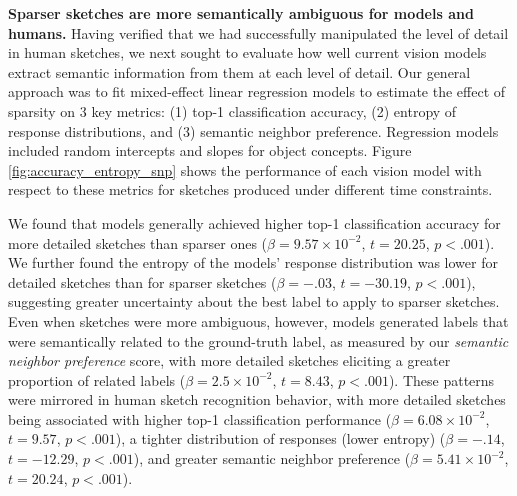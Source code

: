 \documentclass{article}
\begin{document}
\textbf{Sparser sketches are more semantically ambiguous for models and humans.}
Having verified that we had successfully manipulated the level of detail in human sketches, we next sought to evaluate how well current vision models extract semantic information from them at each level of detail. 
Our general approach was to fit mixed-effect linear regression models to estimate the effect of sparsity on 3 key metrics: (1) top-1 classification accuracy, (2) entropy of response distributions, and (3) semantic neighbor preference. Regression models included random intercepts and slopes for object concepts.
Figure \ref{fig:accuracy_entropy_snp} shows the performance of each vision model with respect to these metrics for sketches produced under different time constraints.



We found that models generally achieved higher top-1 classification accuracy for more detailed sketches than sparser ones ($\beta=9.57\times10^{-2}$, $t=20.25$, $p<.001$).
We further found the entropy of the models' response distribution was lower for detailed sketches than for sparser sketches ($\beta = -.03$, $t = -30.19$, $p<.001$), suggesting greater uncertainty about the best label to apply to sparser sketches. 
Even when sketches were more ambiguous, however, models generated labels that were semantically related to the ground-truth label, as measured by our \textit{semantic neighbor preference} score, with more detailed sketches eliciting a greater proportion of related labels ($\beta = 2.5 \times10^{-2}$, $t=8.43$, $p <.001$).
These patterns were mirrored in human sketch recognition behavior, with more detailed sketches being associated with higher top-1 classification performance ($\beta = 6.08\times10^{-2}$, $t=9.57$, $p<.001$), a tighter distribution of responses (lower entropy) ($\beta=-.14$, $t=-12.29$, $p<.001$), and greater semantic neighbor preference ($\beta=5.41\times10^{-2}$, $t=20.24$, $p<.001$).
\end{document}
